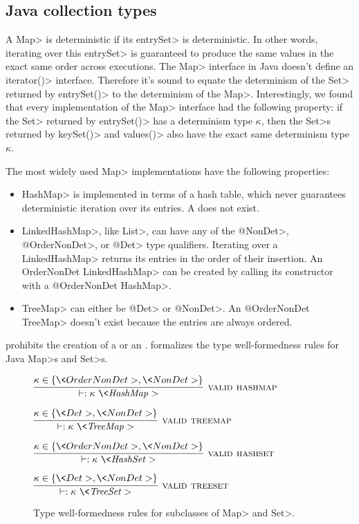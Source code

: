 \subsection{Java collection types}\label{sec:maps-java}

A \<Map> is deterministic if its \<entrySet> is deterministic.
In other words, iterating over this \<entrySet> is guaranteed to produce the same values in the exact same order across executions.
The \<Map> interface in Java doesn't define an \<iterator()> interface. Therefore it's sound to equate the determinism of the \<Set>
returned by \<entrySet()> to the determinism of the \<Map>. Interestingly, we found that every implementation of the \<Map> 
interface had the following property: if the \<Set> returned by \<entrySet()> has a determinism type $\kappa$, then
the \<Set>s returned by \<keySet()> and \<values()> also have the exact same determinism type $\kappa$.

The most widely used \<Map> implementations have the following properties:
\begin{itemize}
    \item \<HashMap> is implemented in terms of a hash table, which never
      guarantees deterministic iteration over its entries. A  does not exist.
    \item \<LinkedHashMap>, like \<List>, can have any of the \<@NonDet>,
      \<@OrderNonDet>, or \<@Det> type qualifiers. Iterating over a
      \<LinkedHashMap> returns
    its entries in the order of their insertion. An \<OrderNonDet
    LinkedHashMap> can be created by calling its constructor with a
    \<@OrderNonDet HashMap>.
    \item \<TreeMap> can either be \<@Det> or \<@NonDet>. An \<@OrderNonDet
      TreeMap> doesn't exist because the entries are always ordered.
\end{itemize}

\TheDeterminismChecker prohibits the creation of a  or an .
 formalizes the type well-formedness rules for
Java \<Map>s and \<Set>s.

\begin{figure}
    $\infer[\rulename{valid hashmap}]{\vdash: \|\kappa\ \<HashMap>|}{\kappa \in \{ \<OrderNonDet>, \<NonDet> \}}$
    
    \bigskip
    
    $\infer[\rulename{valid treemap}]{\vdash: \|\kappa\ \<TreeMap>|}{\kappa \in \{ \<Det>, \<NonDet> \}}$
    
    \bigskip
    
    $\infer[\rulename{valid hashset}]{\vdash: \|\kappa\ \<HashSet>|}{\kappa \in \{ \<OrderNonDet>, \<NonDet> \}}$
    
    \bigskip
    
    $\infer[\rulename{valid treeset}]{\vdash: \|\kappa\ \<TreeSet>|}{\kappa \in \{ \<Det>, \<NonDet> \}}$
    \caption{Type well-formedness rules for subclasses of \<Map> and \<Set>.}
    \label{fig-creation-rules}
\end{figure}

